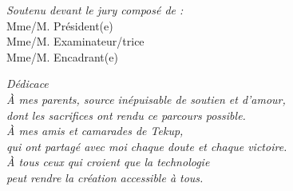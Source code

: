 \documentclass[12pt,a4paper,oneside]{report}
\begin{document}
\begin{titlepage}
\vspace{0.6cm}

\vfill
{\small \textit{Soutenu devant le jury composé de :}\\
Mme/M. \underline{\hspace{4cm}} \quad Président(e)\\
Mme/M. \underline{\hspace{4cm}} \quad Examinateur/trice\\
Mme/M. \underline{\hspace{4cm}} \quad Encadrant(e)}
\end{titlepage}

\cleardoublepage\thispagestyle{empty}
\vspace*{6cm}
\begin{center}
\textit{\Large Dédicace}\\[1cm]\large
\textit{À mes parents, source inépuisable de soutien et d'amour,\\
dont les sacrifices ont rendu ce parcours possible.}\\[0.6cm]
\textit{À mes amis et camarades de Tekup,\\
qui ont partagé avec moi chaque doute et chaque victoire.}\\[0.6cm]
\textit{À tous ceux qui croient que la technologie\\
peut rendre la création accessible à tous.}
\end{center}

\cleardoublepage
\end{document}
